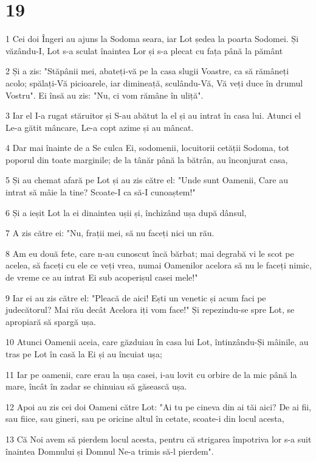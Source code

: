 \chapter{19}

\par 1 Cei doi Îngeri au ajuns la Sodoma seara, iar Lot ședea la poarta Sodomei. Și văzându-I, Lot s-a sculat înaintea Lor și s-a plecat cu fața până la pământ
\par 2 Și a zis: "Stăpânii mei, abateți-vă pe la casa slugii Voastre, ca să rămâneți acolo; spălați-Vă picioarele, iar dimineață, sculându-Vă, Vă veți duce în drumul Vostru". Ei însă au zis: "Nu, ci vom rămâne în uliță".
\par 3 Iar el I-a rugat stăruitor și S-au abătut la el și au intrat în casa lui. Atunci el Le-a gătit mâncare, Le-a copt azime și au mâncat.
\par 4 Dar mai înainte de a Se culca Ei, sodomenii, locuitorii cetății Sodoma, tot poporul din toate marginile; de la tânăr până la bătrân, au înconjurat casa,
\par 5 Și au chemat afară pe Lot și au zis către el: "Unde sunt Oamenii, Care au intrat să mâie la tine? Scoate-I ca să-I cunoaștem!"
\par 6 Și a ieșit Lot la ei dinaintea ușii și, închizând ușa după dânsul,
\par 7 A zis către ei: "Nu, frații mei, să nu faceți nici un rău.
\par 8 Am eu două fete, care n-au cunoscut încă bărbat; mai degrabă vi le scot pe acelea, să faceți cu ele ce veți vrea, numai Oamenilor acelora să nu le faceți nimic, de vreme ce au intrat Ei sub acoperișul casei mele!"
\par 9 Iar ei au zis către el: "Pleacă de aici! Ești un venetic și acum faci pe judecătorul? Mai rău decât Acelora iți vom face!" Și repezindu-se spre Lot, se apropiară să spargă ușa.
\par 10 Atunci Oamenii aceia, care găzduiau în casa lui Lot, întinzându-Și mâinile, au tras pe Lot în casă la Ei și au încuiat ușa;
\par 11 Iar pe oamenii, care erau la ușa casei, i-au lovit cu orbire de la mic până la mare, încât în zadar se chinuiau să găsească ușa.
\par 12 Apoi au zis cei doi Oameni către Lot: "Ai tu pe cineva din ai tăi aici? De ai fii, sau fiice, sau gineri, sau pe oricine altul în cetate, scoate-i din locul acesta,
\par 13 Că Noi avem să pierdem locul acesta, pentru că strigarea împotriva lor s-a suit înaintea Domnului și Domnul Ne-a trimis să-l pierdem".
